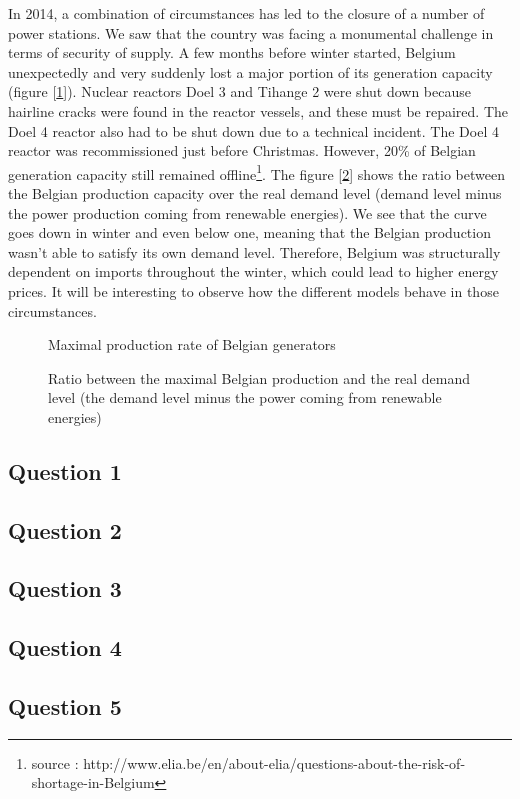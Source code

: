 \documentclass[a4paper,11pt]{article}
\begin{document}
In 2014, a combination of circumstances has led to the closure of a number of power stations. We saw that the country was facing a monumental challenge in terms of security of supply. A few months before winter started, Belgium unexpectedly and very suddenly lost a major portion of its generation capacity (figure [\ref{fig:capa}]). Nuclear reactors Doel 3 and Tihange 2 were shut down because hairline cracks were found in the reactor vessels, and these must be repaired. The Doel 4 reactor also had to be shut down due to a technical incident. The Doel 4 reactor was recommissioned just before Christmas. However, 20\% of Belgian generation capacity still remained offline\footnote{source : http://www.elia.be/en/about-elia/questions-about-the-risk-of-shortage-in-Belgium}. The figure [\ref{fig:ratio}] shows the ratio between the Belgian production capacity over the real demand level (demand level minus the power production coming from renewable energies). We see that the curve goes down in winter and even below one, meaning that the Belgian production wasn't able to satisfy its own demand level. Therefore, Belgium was structurally dependent on imports throughout the winter, which could lead to higher energy prices. It will be interesting to observe how the different models behave in those circumstances.

\begin{figure}[H]
    \centering
    \setlength\fheight{4cm}
    \setlength{}
    
    \caption{Maximal production rate of Belgian generators}
    \label{fig:capa}
\end{figure}

\begin{figure}[H]
    \centering
    \setlength\fheight{4cm}
    \setlength{}
    
    \caption{Ratio between the maximal Belgian production and the real demand level (the demand level minus the power coming from renewable energies)}
    \label{fig:ratio}
\end{figure}

\newpage
\subsection{Question 1}

\subsection{Question 2}

\subsection{Question 3}

\subsection{Question 4}

\subsection{Question 5}

\end{document}
